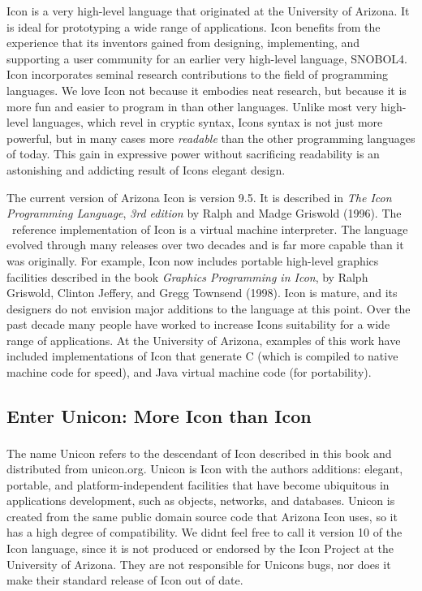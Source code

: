 Icon is a very high-level language that
originated at the University of Arizona. It is ideal for prototyping a
wide range of applications. Icon benefits from the experience that its
inventors gained from designing, implementing, and supporting a user
community for an earlier very high-level language,
SNOBOL4. Icon incorporates seminal research
contributions to the field of programming languages. We love Icon not
because it embodies neat research, but because it is more fun and
easier to program in than other languages. Unlike most very high-level
languages, which revel in cryptic syntax, Icon{\textquotesingle}s
syntax is not just more powerful, but in many cases more
\textit{readable} than the other programming languages of today. This
gain in expressive power without sacrificing readability is an
astonishing and addicting result of Icon{\textquotesingle}s elegant
design.

The current version of Arizona Icon is version 9.5. It is described in
\textit{The Icon Programming Language}, \textit{3rd edition} by Ralph
and Madge Griswold (1996). The \ reference implementation of Icon is a
virtual machine interpreter. The language evolved through many releases
over two decades and is far more capable than it was originally. For
example, Icon now includes portable high-level graphics facilities
described in the book \textit{Graphics Programming in Icon}, by Ralph
Griswold, Clinton Jeffery, and Gregg
Townsend (1998). Icon is mature, and its
designers do not envision major additions to the language at this
point. Over the past decade many people have worked to increase
Icon{\textquotesingle}s suitability for a wide range of applications.
At the University of Arizona, examples of this work have included
implementations of Icon that generate C (which is compiled to native
machine code for speed), and Java virtual
machine code (for portability).

\subsection{Enter Unicon: More Icon than Icon}

The name Unicon\textbf{\textsuperscript{ }}refers to the descendant of
Icon described in this book and distributed from unicon.org. Unicon is
Icon with the authors{\textquotesingle} additions: elegant, portable,
and platform-independent facilities that have become ubiquitous in
applications development, such as objects, networks, and databases.
Unicon is created from the same public domain source code that Arizona
Icon uses, so it has a high degree of compatibility. We
didn{\textquotesingle}t feel free to call it version 10 of the Icon
language, since it is not produced or endorsed by the Icon Project at
the University of Arizona. They are not responsible for
Unicon{\textquotesingle}s bugs, nor does it make their standard release
of Icon out of date.

